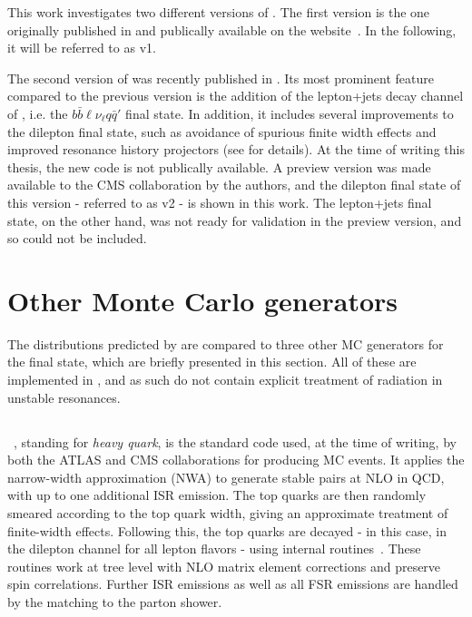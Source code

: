 This work investigates two different versions of \bbfourl. The first version is the one originally published in  and publically available on the \powheg website~\cite{Powheg:website}. In the following, it will be referred to as \bbfourl v1.

The second version of \bbfourl was recently published in . Its most prominent feature compared to the previous version is the addition of the lepton+jets decay channel of \ttbar, i.e. the $b \bar{b} \ell \nu_{\ell} q \bar{q}'$ final state. In addition, it includes several improvements to the dilepton final state, such as avoidance of spurious finite width effects and improved resonance history projectors (see  for details). At the time of writing this thesis, the new code is not publically available. A preview version was made available to the CMS collaboration by the authors, and the dilepton final state of this version - referred to as \bbfourl v2 - is shown in this work. The lepton+jets final state, on the other hand, was not ready for validation in the preview version, and so could not be included.

\section{Other \ttbartitle Monte Carlo generators}
\label{sec:bb4l:others}

The distributions predicted by \bbfourl are compared to three other MC generators for the \tttW final state, which are briefly presented in this section. All of these are implemented in \powhegvtwo, and as such do not contain explicit treatment of radiation in unstable resonances.

\subsection{\texorpdfstring{\hvq}{hvq}}

\hvq~\cite{Frixione:2007nw}, standing for \textit{heavy quark}, is the standard code used, at the time of writing, by both the ATLAS and CMS collaborations for producing \ttbar MC events. It applies the narrow-width approximation (NWA) to generate stable \ttbar pairs at NLO in QCD, with up to one additional ISR emission. The top quarks are then randomly smeared according to the top quark width, giving an approximate treatment of finite-width effects. Following this, the top quarks are decayed - in this case, in the dilepton channel for all lepton flavors - using internal \powheg routines~\cite{Frixione:2007zp}. These routines work at tree level with NLO matrix element corrections and preserve spin correlations. Further ISR emissions as well as all FSR emissions are handled by the matching to the parton shower.

